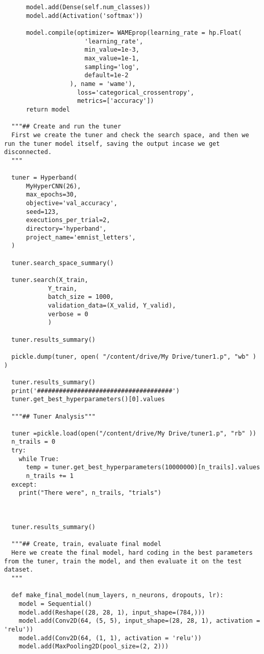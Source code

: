 \documentclass[12pt]{article}
\numberwithin{equation}{section}
\numberwithin{figure}{section}
\numberwithin{table}{section}
\begin{document}
\begin{lstlisting}
      model.add(Dense(self.num_classes))
      model.add(Activation('softmax'))
  
      model.compile(optimizer= WAMEprop(learning_rate = hp.Float(
                      'learning_rate',
                      min_value=1e-3,
                      max_value=1e-1,
                      sampling='log',
                      default=1e-2
                  ), name = 'wame'),
                    loss='categorical_crossentropy',
                    metrics=['accuracy'])
      return model
  
  """## Create and run the tuner
  First we create the tuner and check the search space, and then we run the tuner model itself, saving the output incase we get disconnected.
  """
  
  tuner = Hyperband(
      MyHyperCNN(26),
      max_epochs=30,
      objective='val_accuracy',
      seed=123,
      executions_per_trial=2,
      directory='hyperband',
      project_name='emnist_letters',
  )
  
  tuner.search_space_summary()
  
  tuner.search(X_train,
            Y_train,
            batch_size = 1000,
            validation_data=(X_valid, Y_valid),
            verbose = 0
            )
  
  tuner.results_summary()
  
  pickle.dump(tuner, open( "/content/drive/My Drive/tuner1.p", "wb" ) )
  
  tuner.results_summary()
  print('#####################################')
  tuner.get_best_hyperparameters()[0].values
  
  """## Tuner Analysis"""
  
  tuner =pickle.load(open("/content/drive/My Drive/tuner1.p", "rb" ))
  n_trails = 0
  try:
    while True:
      temp = tuner.get_best_hyperparameters(10000000)[n_trails].values
      n_trails += 1
  except:
    print("There were", n_trails, "trials")
  
  
  
  tuner.results_summary()
  
  """## Create, train, evaluate final model
  Here we create the final model, hard coding in the best parameters from the tuner, train the model, and then evaluate it on the test dataset.
  """
  
  def make_final_model(num_layers, n_neurons, dropouts, lr):
    model = Sequential()
    model.add(Reshape((28, 28, 1), input_shape=(784,)))
    model.add(Conv2D(64, (5, 5), input_shape=(28, 28, 1), activation = 'relu'))
    model.add(Conv2D(64, (1, 1), activation = 'relu'))
    model.add(MaxPooling2D(pool_size=(2, 2)))
  

\end{lstlisting}
\end{document}
